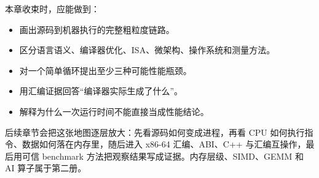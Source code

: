 本章收束时，应能做到：

\begin{itemize}
  \item 画出源码到机器执行的完整粗粒度链路。
  \item 区分语言语义、编译器优化、ISA、微架构、操作系统和测量方法。
  \item 对一个简单循环提出至少三种可能性能瓶颈。
  \item 用汇编证据回答“编译器实际生成了什么”。
  \item 解释为什么一次运行时间不能直接当成性能结论。
\end{itemize}

后续章节会把这张地图逐层放大：先看源码如何变成进程，再看 CPU 如何执行指令、数据如何落在内存里，随后进入 x86-64 汇编、ABI、C++ 与汇编互操作，最后用可信 benchmark 方法把观察结果写成证据。内存层级、SIMD、GEMM 和 AI 算子属于第二册。
